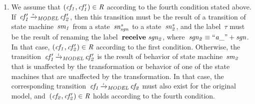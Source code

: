 \begin{enumerate}
\item
We assume that $(\it{cf_1}, \it{cf_1'})\in R$ according to the fourth condition stated above.
If~$\it{cf_1'} \TextModelRelation{\tau} \it{cf_2'}$, then this transition must be the result of a transition of state machine~$\it{sm_1}$ from a state~$\it{sn^s_{sgn}}$ to a state~$\it{sn^s_2}$, and the label~$\tau$ must be the result of renaming the label~$\textbf{receive}\ \it{sgn_2}$, where~$\it{sgn_2} \equiv ``a\_" + \it{sgn}$.
In that case, $(\it{cf_1}, \it{cf_2'})\in R$ according to the first condition.
Otherwise, the transition~$\it{cf_1'} \TextModelRelation{\it{l}} \it{cf_2'}$ is the result of behavior of state machine~$\it{sm_2}$ that is unaffected by the transformation or behavior of one of the state machines that are unaffected by the transformation.
In that case, the corresponding transition~$\it{cf_1} \TextModelRelation{l} \it{cf_2}$ must also exist for the original model, and~$(\it{cf_2}, \it{cf_2'})\in R$ holds according to the fourth condition.

\end{enumerate} 
